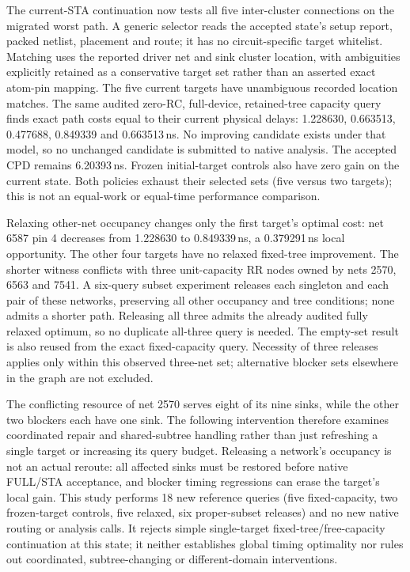 The current-STA continuation now tests all five inter-cluster connections on the migrated worst path. A generic selector reads the accepted state's setup report, packed netlist, placement and route; it has no circuit-specific target whitelist. Matching uses the reported driver net and sink cluster location, with ambiguities explicitly retained as a conservative target set rather than an asserted exact atom-pin mapping. The five current targets have unambiguous recorded location matches. The same audited zero-RC, full-device, retained-tree capacity query finds exact path costs equal to their current physical delays: 1.228630, 0.663513, 0.477688, 0.849339 and 0.663513\,ns. No improving candidate exists under that model, so no unchanged candidate is submitted to native analysis. The accepted CPD remains 6.20393\,ns. Frozen initial-target controls also have zero gain on the current state. Both policies exhaust their selected sets (five versus two targets); this is not an equal-work or equal-time performance comparison.

Relaxing other-net occupancy changes only the first target's optimal cost: net 6587 pin 4 decreases from 1.228630 to 0.849339\,ns, a 0.379291\,ns local opportunity. The other four targets have no relaxed fixed-tree improvement. The shorter witness conflicts with three unit-capacity RR nodes owned by nets 2570, 6563 and 7541. A six-query subset experiment releases each singleton and each pair of these networks, preserving all other occupancy and tree conditions; none admits a shorter path. Releasing all three admits the already audited fully relaxed optimum, so no duplicate all-three query is needed. The empty-set result is also reused from the exact fixed-capacity query. Necessity of three releases applies only within this observed three-net set; alternative blocker sets elsewhere in the graph are not excluded.

The conflicting resource of net 2570 serves eight of its nine sinks, while the other two blockers each have one sink. The following intervention therefore examines coordinated repair and shared-subtree handling rather than just refreshing a single target or increasing its query budget. Releasing a network's occupancy is not an actual reroute: all affected sinks must be restored before native FULL/STA acceptance, and blocker timing regressions can erase the target's local gain. This study performs 18 new reference queries (five fixed-capacity, two frozen-target controls, five relaxed, six proper-subset releases) and no new native routing or analysis calls. It rejects simple single-target fixed-tree/free-capacity continuation at this state; it neither establishes global timing optimality nor rules out coordinated, subtree-changing or different-domain interventions.
